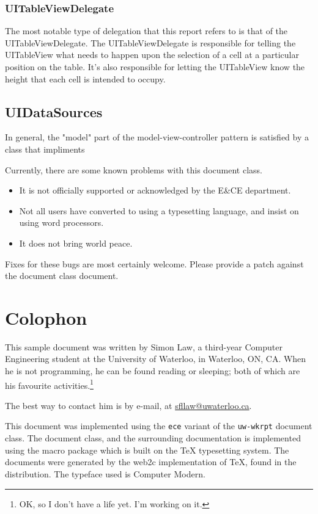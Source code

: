 \documentclass[se]{uw-wkrpt}
\begin{document}
\subsubsection{UITableViewDelegate}

The most notable type of delegation that this report refers to is
that of the UITableViewDelegate. The UITableViewDelegate is responsible
for telling the UITableView what needs to happen upon the selection of
a cell at a particular position on the table. It's also responsible for 
letting the UITableView know the height that each cell is intended to
occupy.

\subsection{UIDataSources}

In general, the "model" part of the model-view-controller pattern is 
satisfied by a class that impliments 

Currently, there are some known problems with this document class.
\begin{itemize}
  \item It is not officially supported or acknowledged by the
        E\&CE department.
  \item Not all users have converted to using a typesetting language, and
        insist on using word processors.
  \item It does not bring world peace.
\end{itemize}

Fixes for these bugs are most certainly welcome.  Please provide a patch
against the document class document.

\section{Colophon}\label{app:colophon}
This sample document was written by Simon Law, a third-year Computer
Engineering student at the University of Waterloo, in Waterloo, ON, CA.
When he is not programming, he can be found reading or sleeping;
both of which are his favourite activities.\footnote{OK, so I don't
have a life yet.  I'm working on it.}

The best way to contact him is by e-mail, at \url{sfllaw@uwaterloo.ca}.

This document was implemented using the \texttt{ece} variant of the
\texttt{uw-wkrpt} document class.  The document class, and the 
surrounding documentation is implemented using the \LaTeXe{} macro 
package which is built on the \TeX{} typesetting system.  The documents
were generated by the web2c implementation of \TeX, found in the 
\teTeX{} distribution.  The typeface used is Computer Modern.
\end{document}
